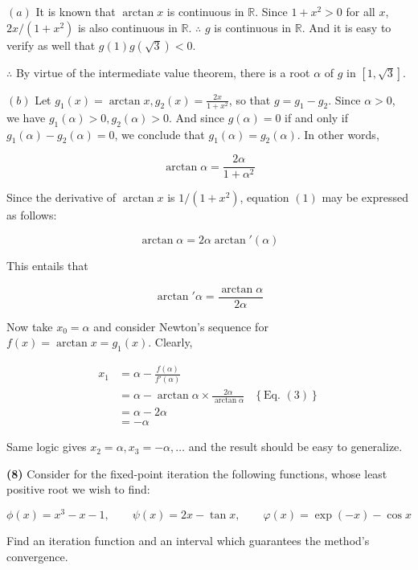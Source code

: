 \documentclass[12pt]{article}
\theoremstyle{definition}
\begin{document}
$(a)$ It is known that $\arctan x$ is continuous in $\mathbb{R}$. Since $1 + x^2 >
0$ for all $x$, $2x / (1+x^2)$ is also continuous in $\mathbb{R}$. $\therefore $
$g$ is continuous in $\mathbb{R}$. And it is easy to verify as well that
$g(1)g(\sqrt{3} ) < 0$. 

$\therefore $ By virtue of the intermediate value theorem, there is a root
$\alpha$ of $g$ in $[1, \sqrt{3}] $.

$(b)$ Let $g_1(x) = \arctan x, g_2(x) = \frac{2x}{1+x^2}$, so that $g = g_1 -
g_2$. Since $\alpha > 0$, we have $g_1(\alpha) > 0, g_2(\alpha) > 0$. And since
$g(\alpha) = 0$ if and only if $g_1(\alpha) - g_2(\alpha) = 0$, we conclude that 
$g_1(\alpha) = g_2(\alpha)$. In other words, 

\begin{equation}
    \arctan \alpha = \frac{2\alpha}{1+\alpha^2}
\end{equation}

Since the derivative of $\arctan x$ is $1 / (1+x^2)$, equation $(1)$ may be
expressed as follows: 

\begin{equation}
    \arctan \alpha = 2\alpha \arctan'(\alpha)
\end{equation}

This entails that 

\begin{equation}
    \arctan' \alpha = \frac{\arctan \alpha}{2\alpha}
\end{equation}

Now take $x_0 = \alpha$ and consider Newton's sequence for $f(x) = \arctan x =
g_1(x)$. Clearly,

\begin{align*}
    x_1 
    &= \alpha - \frac{f(\alpha)}{f'(\alpha)} \\ 
    &= \alpha - \arctan \alpha \times \frac{2\alpha}{\arctan \alpha} &\left\{
    \text{Eq. } (3) \right\}  \\ 
    &= \alpha - 2\alpha \\ 
    &=-\alpha
\end{align*}

Same logic gives $x_2 = \alpha, x_3 = -\alpha, \ldots$ and the result should be
easy to generalize.

\pagebreak 

\begin{shaded}
    \textbf{(8)} Consider  for the fixed-point iteration the following
    functions, whose least positive root we wish to find:

    \begin{equation*}
        \phi(x) = x^3 - x - 1,\qquad \psi(x) = 2x - \tan x, \qquad \varphi(x) = \exp(-x) -
        \cos x
    \end{equation*}

    Find an iteration function and an interval which guarantees the method's
    convergence.
\end{shaded}
\end{document}

